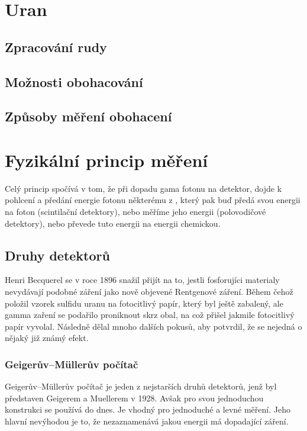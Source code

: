 \section{Uran}
\subsection{Zpracování rudy}
\subsection{Možnosti obohacování}
\subsection{Způsoby měření obohacení}

\section{Fyzikální princip měření}
Celý princip spočívá v tom, že při dopadu gama fotonu na detektor, dojde k pohlcení a předání energie fotonu některému z \e , který pak buď předá svou energii na foton (scintilační detektory), nebo měříme jeho energii (polovodičové detektory), nebo převede tuto energii na energii chemickou.
\subsection{Druhy detektorů}
Henri Becquerel se v roce 1896 snažil přijít na to, jestli fosforujíci materialy nevydávají podobné záření jako nově objevené Rentgenové záření. Během čehož položil vzorek sulfidu uranu na fotocitlivý papír, který byl ještě zabalený, ale gamma zaření se podařilo proniknout skrz obal, na což přišel jakmile fotocitlivý papír vyvolal. Následně dělal mnoho dalších pokusů, aby potvrdil, že se nejedná o nějaký již známý efekt.  \cite{Radioactivity}%

\subsubsection{Geigerův–Müllerův počítač}
Geigerův–Müllerův počítač je jeden z nejstarších druhů detektorů, jenž byl představen Geigerem a Muellerem v 1928. Avšak pro svou jednoduchou konstrukci se používá do dnes. Je vhodný pro jednoduché a levné měření. Jeho hlavní nevýhodou je to, že nezaznamenává jakou energii má dopadající záření. 



